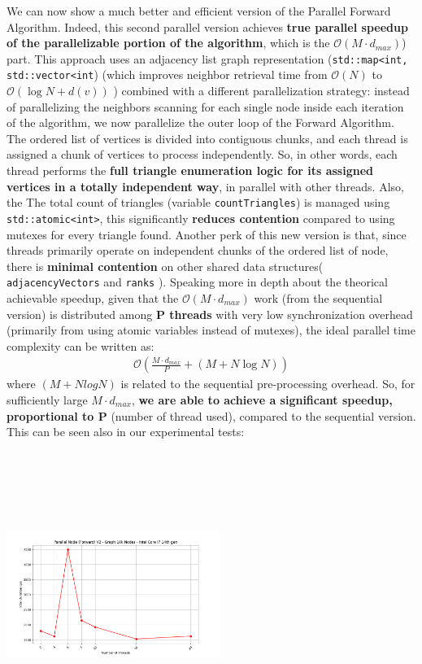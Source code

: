 \documentclass{aes2e}
\begin{document}
We can now show a much better and efficient version of the Parallel Forward Algorithm. Indeed, this second parallel version achieves \textbf{true parallel speedup of the parallelizable portion of the algorithm}, which is the $\mathcal{O}\left(M \cdot d_{max}\right)$) part. This approach uses an adjacency list graph representation (\texttt{std::map<int, std::vector<int}) (which improves neighbor retrieval time from $\mathcal{O}\left(N\right)$ to $\mathcal{O}\left(\log N + d(v)\right)$ ) combined with a different parallelization strategy: instead of parallelizing the neighbors scanning for each single node inside each iteration of the algorithm, we now parallelize the outer loop of the Forward Algorithm. The ordered list of vertices is divided into contiguous chunks, and each thread is assigned a chunk of vertices to process independently. So, in other words, each thread performs the \textbf{full triangle enumeration logic for its assigned vertices in a totally independent way}, in parallel with other threads. Also, the The total count of triangles (variable \texttt{countTriangles}) is managed using \texttt{std::atomic<int>}, this significantly \textbf{reduces contention} compared to using mutexes for every triangle found. Another perk of this new version is that, since threads primarily operate on independent chunks of the ordered list of node, there is \textbf{minimal contention} on other shared data structures( \texttt{adjacencyVectors} and \texttt{ranks} ). Speaking more in depth about the theorical achievable speedup, given that the $\mathcal{O}(M \cdot d_{max})$ work (from the sequential version) is distributed among \textbf{P threads} with very low synchronization overhead (primarily from using atomic variables instead of mutexes), the ideal parallel time complexity can be written as:
\begin{align*}
\mathcal{O}\left(\frac{M \cdot d_{max}}{P} + (M + N \log N)\right)
\end{align*}
where $(M+NlogN)$ is related to the sequential pre-processing overhead. So, for sufficiently large $M \cdot d_{max}$, \textbf{we are able to achieve a significant speedup, proportional to P} (number of thread used), compared to the sequential version. This can be seen also in our experimental tests:
\includegraphics[width=0.52\textwidth, height=10cm, keepaspectratio]{charts/Parallel Node (Forward) V2 - Graph 10k Nodes - Intel Core i7 14th gen.png}
\end{document}
